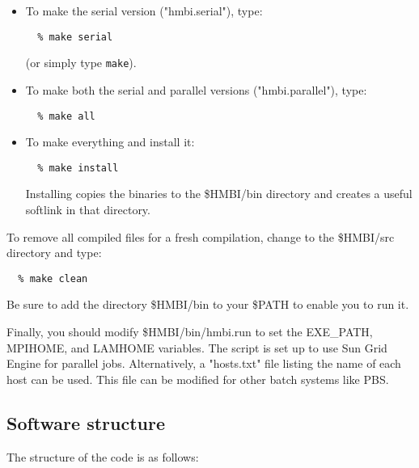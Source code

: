 \documentclass[11pt,letterpaper]{article}
\begin{document}
\begin{spacing}{1.0}
\begin{itemize}
\item To make the serial version ("hmbi.serial"), type:
\begin{verbatim}
  % make serial
\end{verbatim}
(or simply type {\tt make}).  
\item To make both the serial and parallel versions ("hmbi.parallel"), type:
\begin{verbatim}
  % make all
\end{verbatim}
\item To make everything and install it:
\begin{verbatim}
  % make install 
\end{verbatim}
Installing copies the binaries to the \$HMBI/bin directory and creates
a useful softlink in that directory.  
\end{itemize}

To remove all compiled files for a fresh compilation, change to the \$HMBI/src
directory and type:
\begin{verbatim}
  % make clean
\end{verbatim}

Be sure to add the directory \$HMBI/bin to your \$PATH to enable you to run it.

Finally, you should modify \$HMBI/bin/hmbi.run to set the EXE\_PATH, MPIHOME, 
and LAMHOME variables.  The script is set up to use Sun Grid Engine for
parallel jobs.  Alternatively, a "hosts.txt" file listing the name of each
host can be used.  This file can be modified for other batch systems like
PBS.  


\subsection{Software structure}

The structure of the code is as follows:

\vspace{3mm}


\end{spacing}
\end{document}
